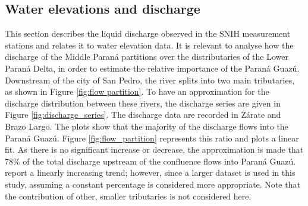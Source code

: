 \subsection{Water elevations and discharge}
This section describes the liquid discharge observed in the SNIH measurement stations and relates it to water elevation data. It is relevant to analyse how the discharge of the Middle Paraná partitions over the distributaries of the Lower Paraná Delta, in order to estimate the relative importance of the Paraná Guazú. Downstream of the city of San Pedro, the river splits into two main tributaries, as shown in Figure \ref{fig:flow partition}. To have an approximation for the discharge distribution between these rivers, the discharge series are given in Figure \ref{fig:discharge_series}. The discharge data are recorded in Zárate and Brazo Largo. The plots show that the majority of the discharge flows into the Paraná Guazú. Figure \ref{fig:flow_partition} represents this ratio and plots a linear fit. As there is no significant increase or decrease, the approximation is made that 78\% of the total discharge upstream of the confluence flows into Paraná Guazú. \textcite{reMetodologiaParaGeneracion2009} report a linearly increasing trend; however, since a larger dataset is used in this study, assuming a constant percentage is considered more appropriate. Note that the contribution of other, smaller tributaries is not considered here. 

